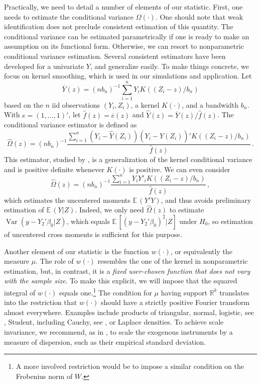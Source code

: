 \documentclass[12pt]{article}
\newcommand{\E}{\operatorname{E}}
\newcommand{\1}{\mathbf{1}}
\newcommand{\Var}{\operatorname{Var}}
\def\E{\mathbb{E}\,}
\def\Rit{\mathbb{R}}
\begin{document}
Practically, we need to detail a number of elements of our
statistic. First, one needs to estimate the conditional variance $\Omega(\cdot)$.
One should note that weak identification does not preclude consistent
estimation of this quantity.
The conditional variance can be estimated parametrically if
one is ready to make an assumption on its functional form.  Otherwise,
we can resort to nonparametric conditional variance estimation.
Several consistent estimators have been developed for a univariate
$Y$, and generalize easily.  To make things concrete, we focus on
kernel smoothing, which is used in our simulations and application.
Let
\[
\overline{Y}(z) =  \left(nb_n\right)^{-1} \sum_{i=1}^n Y_i K \left( (
 Z_i - z)/ b_n \right)
\]
based on the $n$ iid observations $(Y_{i},Z_{i})$, a kernel
$K(\cdot)$, and a bandwidth $b_n$.  With $e = (1, \ldots , 1)'$, let
$\widehat{f} (z) = \overline{e} (z)$ and $\widehat{Y} (z) =
\overline{Y}(z)/\widehat{f} (z)$.  The conditional variance estimator
 is defined as
\begin{equation} \label{eq:condit var  estim Y}
  \widehat{\Omega} (z)
  =
\left(nb_n\right)^{-1} \frac{\sum_{i=1}^n \left(Y_{i} - \widehat{Y} (Z_{i})\right)
\left(Y_{i} - \widehat{Y} (Z_{i})\right)'
K \left( ( Z_i - z)/ b_n \right)}{\widehat{f}(z)}
   \, .
\end{equation}
This estimator, studied by \cite{NCM}, is a generalization of the
kernel conditional variance and is positive definite whenever
$K(\cdot)$ is positive.   We can even consider
\[
  \widehat{\Omega} (z)
  =
\left(nb_n\right)^{-1} \frac{\sum_{i=1}^n Y_{i}
Y'_{i} K \left( ( Z_i - z)/ b_n \right)}{\widehat{f}(z)}
   \, ,
\]
which estimates the uncentered moments $\E \left( Y'Y\right)$, and
thus avoids preliminary estimation of $\E (Y|Z)$. Indeed, we only need
$\widehat{\Omega} (z)$ to estimate $\Var(y - Y_2'\beta_0|Z)$,
which equals $\E[(y - Y_2'\beta_0)^2|Z]$ under $H_0$, so estimation
of uncentered cross moments is sufficient for this purpose.

Another element of our statistic is the function $w(\cdot)$, or
equivalently the measure $\mu$. The role of $w(\cdot)$ resembles the
one of the kernel in nonparametric estimation, but, in contrast, it is
a {\em fixed user-chosen function that does not vary with the sample
size}. To make this explicit, we will impose that the squared integral
of $w(\cdot)$ equals one.\footnote{A more involved restriction would
be to impose a similar condition on the Frobenius norm of $W$.}  The
condition for $\mu$ having support $\Rit^{k}$ translates into the
restriction that $w(\cdot)$ should have a strictly positive Fourier
transform almost everywhere.  Examples include products of triangular,
normal, logistic, see \citet[Section 23.3]{JKB95}, Student, including
Cauchy, see \cite{DK2002}, or Laplace densities.  To achieve scale
invariance, we recommend, as in \cite{Bierens82}, to scale the exogenous
instruments by a measure of dispersion, such as their empirical
standard deviation.
\end{document}
